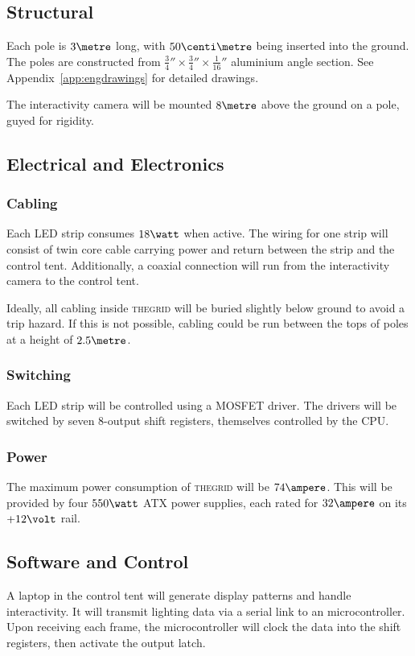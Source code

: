 \documentclass[12pt]{article} %
\newcommand{\thegrid}{\textsc{the\textperiodcentered grid}\xspace}
\begin{document}
\subsection{Structural}
Each pole is $3\metre$ long, with $50\centi\metre$ being inserted into the
ground.  The poles are constructed from $\frac{3}{4}'' \times \frac{3}{4}''
\times \frac{1}{16}''$ aluminium angle section.  See
Appendix~\ref{app:engdrawings} for detailed drawings.

The interactivity camera will be mounted $8\metre$ above the ground on a pole,
guyed for rigidity.

\subsection{Electrical and Electronics}
\subsubsection{Cabling}
Each LED strip consumes $18\watt$ when active.  The wiring for one strip will
consist of twin core cable carrying power and return between the strip and the
control tent.  Additionally, a coaxial connection will run from the
interactivity camera to the control tent.

Ideally, all cabling inside \thegrid will be buried slightly below ground to
avoid a trip hazard.  If this is not possible, cabling could be run between the
tops of poles at a height of $2.5\metre$.

\subsubsection{Switching}
Each LED strip will be controlled using a MOSFET driver.  The drivers will be
switched by seven 8-output shift registers, themselves controlled by the CPU.

\subsubsection{Power}
The maximum power consumption of \thegrid will be $74\ampere$.  This will be
provided by four $550\watt$ ATX power supplies, each rated for $32\ampere$ on
its $+12\volt$ rail.

\subsection{Software and Control}
A laptop in the control tent will generate display patterns and handle
interactivity.  It will transmit lighting data via a serial link to an
microcontroller.  Upon receiving each frame, the microcontroller will clock the
data into the shift registers, then activate the output latch.
\end{document}
